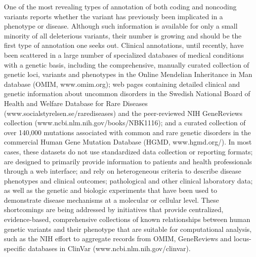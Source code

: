 One of the most revealing types of annotation of both coding and noncoding variants reports whether the variant has previously been implicated in a phenotype or disease. Although such information is available for only a small minority of all deleterious variants, their number is growing and should be the first type of annotation one seeks out. Clinical annotations, until recently, have been scattered in a large number of specialized databases of medical conditions with a genetic basis, including the comprehensive, manually curated collection of genetic loci, variants and phenotypes in the Online Mendelian Inheritance in Man database \cite{hamosh2005online} (OMIM, www.omim.org); web pages containing detailed clinical and genetic information about uncommon disorders in the Swedish National Board of Health and Welfare Database for Rare Diseases (www.socialstyrelsen.se/rarediseases) and the peer-reviewed NIH GeneReviews collection \cite{bryne2008jaspar} (www.ncbi.nlm.nih.gov/books/NBK1116); and a curated collection of over 140,000 mutations associated with common and rare genetic disorders in the commercial Human Gene Mutation Database \cite{stenson2003human} (HGMD, www.hgmd.org/). In most cases, these datasets do not use standardized data collection or reporting formats; are designed to primarily provide information to patients and health professionals through a web interface; and rely on heterogeneous criteria to describe disease phenotypes and clinical outcomes; pathological and other clinical laboratory data; as well as the genetic and biologic experiments that have been used to demonstrate disease mechanisms at a molecular or cellular level. These shortcomings are being addressed by initiatives that provide centralized, evidence-based, comprehensive collections of known relationships between human genetic variants and their phenotype that are suitable for computational analysis, such as the NIH effort to aggregate records from OMIM, GeneReviews \cite{pagon1993genereviews} and locus-specific databases in ClinVar \cite{landrum2013clinvar} (www.ncbi.nlm.nih.gov/clinvar). 

